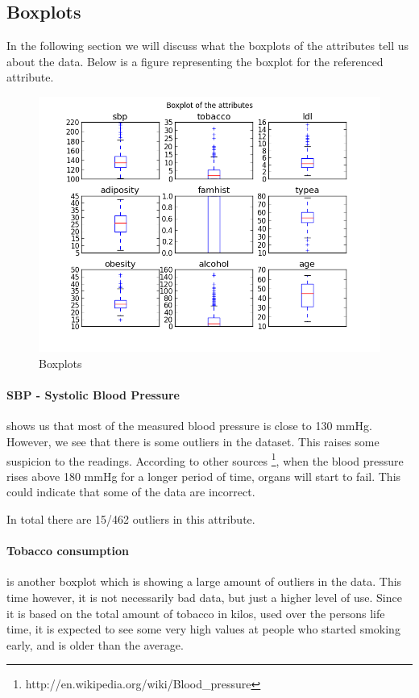 \subsection{Boxplots}
In the following section we will discuss what the boxplots of the attributes tell us about the data.
Below is a figure representing the boxplot for the referenced attribute.
\begin{figure}[H]
\centering
\includegraphics[width=12cm, keepaspectratio=true]{pictures/boxplot.png}
\caption{\footnotesize Boxplots}
\label{boxplot}
\end{figure}
\paragraph{SBP - Systolic Blood Pressure} shows us that most of the measured blood pressure is close to 130 mmHg. However, we see that there is some outliers in the dataset. This raises some suspicion to the readings. According to other sources \footnote{http://en.wikipedia.org/wiki/Blood\_pressure}, when the blood pressure rises above 180 mmHg for a longer period of time, organs will start to fail. This could indicate that some of the data are incorrect.

In total there are 15/462 outliers in this attribute.

\paragraph{Tobacco consumption} is another boxplot which is showing a large amount of outliers in the data. This time however, it is not necessarily bad data, but just a higher level of use. Since it is based on the total amount of tobacco in kilos, used over the persons life time, it is expected to see some very high values at people who started smoking early, and is older than the average.

